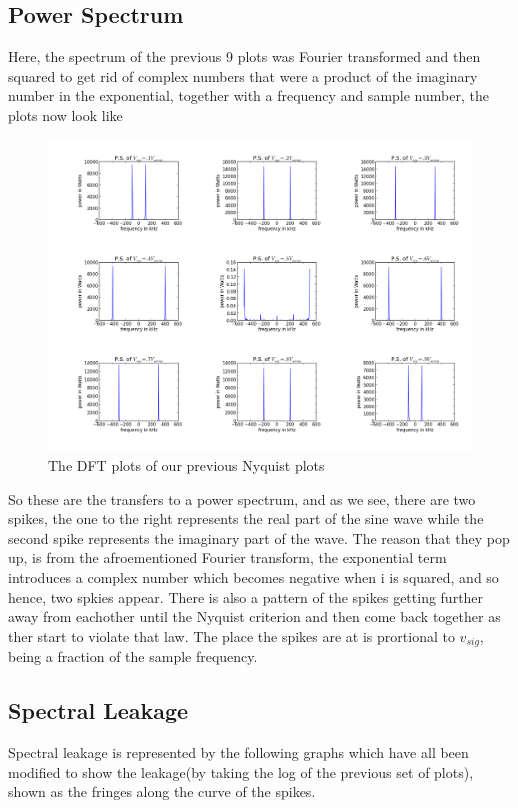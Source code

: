 \documentclass[12 pt]{article}
\begin{document}
\subsection{Power Spectrum}
Here, the spectrum of the previous 9 plots was Fourier transformed
 and then squared to get rid of complex numbers that were a product of
 the imaginary number in the exponential, together with a frequency and
 sample number, the plots now
 look like
 
\begin{figure}[H]
\center
\includegraphics[scale=0.4]{DFTplots.png}
\caption{The DFT plots of our previous Nyquist plots}
\label{DFTplots}
\end{figure}

So these are the transfers to a power spectrum, and as we see, there are
two spikes, the one to the right represents the real part of the sine
wave while the second spike represents the imaginary part of the
wave. The reason that they pop up, is from the afroementioned Fourier
transform, the exponential term introduces a complex number which
becomes negative when i is squared, and so hence, two spkies
appear. There is also a pattern of the spikes getting further away from
eachother until the Nyquist criterion and then come back together as
ther start to violate that law. The place the spikes are at is
prortional to $v_{sig}$, being a fraction of the sample frequency. 

\subsection{Spectral Leakage}
Spectral leakage is represented by the following graphs which have all
been modified to show the leakage(by taking the log of the previous set
of plots), shown as the fringes along the curve
of the spikes. 
\end{document}
